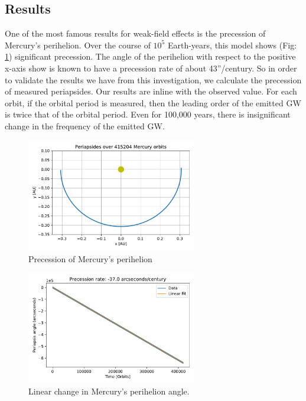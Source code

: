 \documentclass{report}
\begin{document}

        \subsection{Results}

            One of the most famous results for weak-field effects is the precession of Mercury's perihelion.  Over the course of $10^5$ Earth-years, this model shows (Fig: \ref{fig:Trajectory}) significant precession.  The angle of the perihelion with respect to the positive x-axis show is known to have a precession rate of about 43''/century.  So in order to validate the results we have from this investigation, we calculate the precession of measured periapsides.  Our results are inline with the observed value.  For each orbit, if the orbital period is measured, then the leading order of the emitted GW is twice that of the orbital period\cite{Mercury_Euler}.  Even for 100,000 years, there is insignificant change in the frequency of the emitted GW.

            \begin{figure}[h!]
                \centering
                \includegraphics[width=0.66\textwidth]{images/Periapsis_Precession_100000.pdf}
                \caption{Precession of Mercury's perihelion}
                \label{fig:Trajectory}
            \end{figure}
        
            \begin{figure}[h]
                \centering
                \includegraphics[width=0.66\textwidth]{images/Periapsis_angle_legended100000.pdf}
                \caption{Linear change in Mercury's perihelion angle.}
                \label{fig:Angle}
            \end{figure}
        
\end{document}

